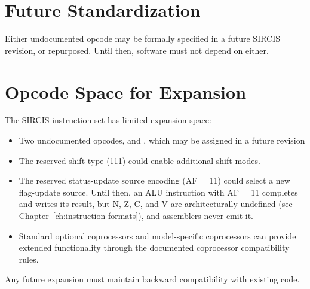 \section{Future Standardization}

Either undocumented opcode may be formally specified in a future SIRCIS revision, or repurposed. Until then, software
must not depend on either.

\section{Opcode Space for Expansion}

The SIRCIS instruction set has limited expansion space:

\begin{itemize}
	\item Two undocumented opcodes,  and , which may be assigned in a future revision
	\item The reserved shift type (111) could enable additional shift modes.
	\item The reserved status-update source encoding (AF = 11) could select a new flag-update source. Until then, an ALU
	      instruction with AF = 11 completes and writes its result, but N, Z, C, and V are architecturally undefined (see
	      Chapter~\ref{ch:instruction-formats}), and assemblers never emit it.
	\item Standard optional coprocessors and model-specific coprocessors can provide extended functionality through the
	      documented coprocessor compatibility rules.
\end{itemize}

Any future expansion must maintain backward compatibility with existing code.
